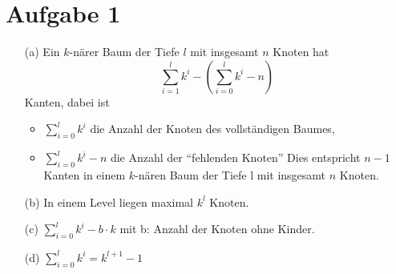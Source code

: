 \documentclass{article}
\begin{document}
\section{Aufgabe 1}
\begin{enumerate}
\item[(a)]
Ein $k$-närer Baum der Tiefe $l$ mit insgesamt $n$ Knoten hat 
\[\sum_{i=1}^l k^i - (\sum_{i=0}^l k^i - n)\] Kanten, dabei ist 
\begin{itemize}
\item $\sum_{i=0}^l k^i$ die Anzahl der Knoten des 
vollständigen Baumes, 
\item $\sum_{i=0}^l k^i - n$ die Anzahl der 
"`fehlenden Knoten"'
Dies entspricht $n-1$ Kanten in einem $k$-nären Baum der Tiefe l mit 
insgesamt $n$ Knoten. 
\end{itemize}

\item[(b)]
In einem Level liegen maximal $k^l$ Knoten.
\item[(c)]
$\sum_{i=0}^l k^i - b \cdot k$ \qquad mit b: Anzahl der Knoten 
ohne Kinder. \\
\item[(d)]
$\sum_{i=0}^l k^i = k^{l+1} - 1$
\end{enumerate}
\end{document}
